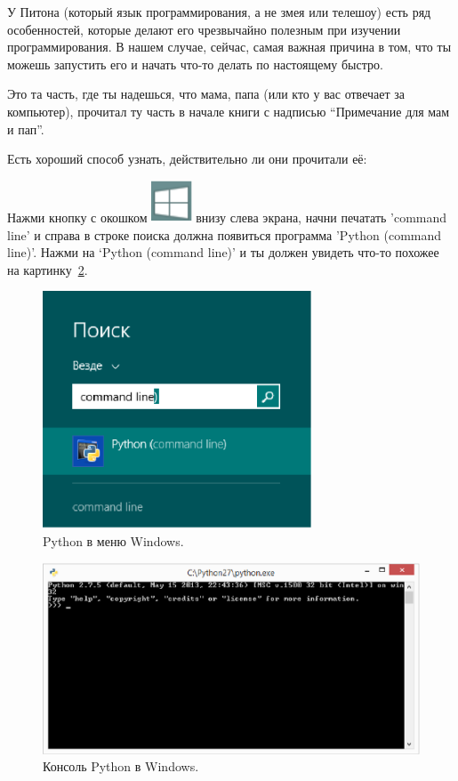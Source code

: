У Питона (который язык программирования, а не змея или телешоу) есть ряд особенностей, которые делают его чрезвычайно полезным при изучении программирования. В нашем случае, сейчас, самая важная причина в том, что ты можешь запустить его и начать что-то делать по настоящему быстро.

Это та часть, где ты надешься, что мама, папа (или кто у вас отвечает за компьютер), прочитал ту часть в начале книги с надписью ``Примечание для мам и пап''.

\noindent
Есть хороший способ узнать, действительно ли они прочитали её:

\begin{WINDOWS}
Нажми кнопку с окошком \includegraphics*[width=12mm]{win-home.eps} внизу слева экрана, начни печатать 'command line' и справа в строке поиска должна появиться программа 'Python (command line)'. Нажми на `Python (command line)' и ты должен увидеть что-то похожее на картинку~\ref{fig2}.

\begin{figure}
\begin{center}
\includegraphics[width=80mm]{figure1.eps}
\end{center}
\caption{Python в меню Windows.}\label{fig1}
\end{figure}

\begin{figure}
\begin{center}
\includegraphics[width=135mm]{figure2.eps}
\end{center}
\caption{Консоль Python в Windows.}\label{fig2}
\end{figure}
\end{WINDOWS}

